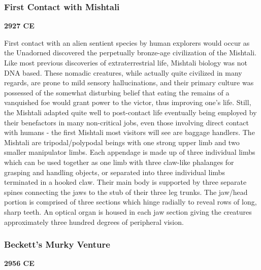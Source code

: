 \subsubsection{First Contact with Mishtali}
{\bf 2927 CE}

First contact with an alien sentient species by human explorers would
occur as the Unadorned discovered the perpetually bronze-age
civilization of the Mishtali.  Like most previous discoveries of
extraterrestrial life, Mishtali biology was not DNA based. These
nomadic creatures, while actually quite civilized in many regards, are
prone to mild sensory hallucinations, and their primary culture was
possessed of the somewhat disturbing belief that eating the remains of
a vanquished foe would grant power to the victor, thus improving one's
life.  Still, the Mishtali adapted quite well to post-contact life
eventually being employed by their benefactors in many non-critical
jobs, even those involving direct contact with humans - the first
Mishtali most visitors will see are baggage handlers.  The Mishtali
are tripodal/polypodal beings with one strong upper limb and two
smaller manipulator limbs.  Each appendage is made up of three
individual limbs which can be used together as one limb with three
claw-like phalanges for grasping and handling objects, or separated
into three individual limbs terminated in a hooked claw.  Their main
body is supported by three separate spines connecting the jaws to the
stub of their three leg trunks.  The jaw/head portion is comprised of
three sections which hinge radially to reveal rows of long, sharp
teeth.  An optical organ is housed in each jaw section giving the
creatures approximately three hundred degrees of peripheral vision.

\subsubsection{Beckett's Murky Venture}
{\bf 2956 CE}

